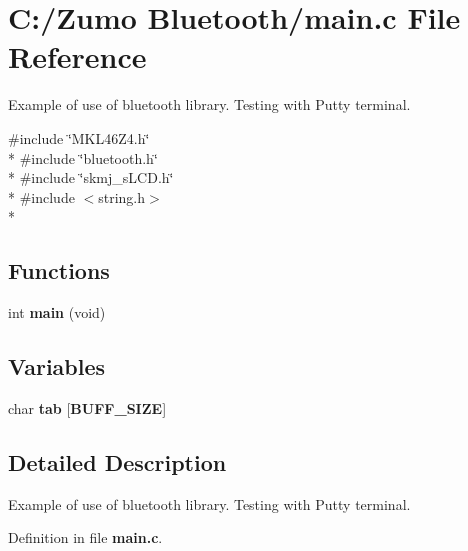\section{C\+:/\+Zumo Bluetooth/main.c File Reference}
\label{main_8c}


Example of use of bluetooth library. Testing with Putty terminal.  


{\ttfamily \#include \char`\"{}M\+K\+L46\+Z4.\+h\char`\"{}}\\*
{\ttfamily \#include \char`\"{}bluetooth.\+h\char`\"{}}\\*
{\ttfamily \#include \char`\"{}skmj\+\_\+s\+L\+C\+D.\+h\char`\"{}}\\*
{\ttfamily \#include $<$string.\+h$>$}\\*
\subsection*{Functions}
\begin{DoxyCompactItemize}
\item 
int {\bfseries main} (void)\label{main_8c_a840291bc02cba5474a4cb46a9b9566fe}

\end{DoxyCompactItemize}
\subsection*{Variables}
\begin{DoxyCompactItemize}
\item 
char {\bfseries tab} [{\bf B\+U\+F\+F\+\_\+\+S\+I\+Z\+E}]\label{main_8c_a93c3eb2fc162e26d6e25fb63eadb4d6a}

\end{DoxyCompactItemize}


\subsection{Detailed Description}
Example of use of bluetooth library. Testing with Putty terminal. 



Definition in file {\bf main.\+c}.

